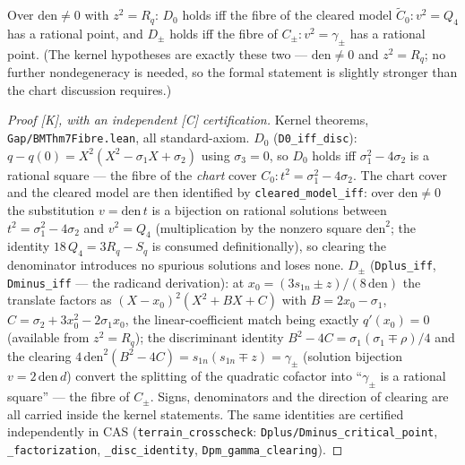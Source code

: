 \begin{proposition}\label{prop:fibre_correspondence}\leanok
Over $\mathrm{den}\neq0$ with $z^{2}=R_{q}$: $D_{0}$ holds iff the fibre of the
cleared model $\widetilde C_{0}\colon v^{2}=Q_{4}$ has a rational point, and
$D_{\pm}$ holds iff the fibre of $C_{\pm}\colon v^{2}=\gamma_{\pm}$ has a
rational point.  (The kernel hypotheses are exactly these two ---
$\mathrm{den}\neq0$ and $z^{2}=R_{q}$; no further nondegeneracy is needed, so
the formal statement is slightly stronger than the chart discussion requires.)
\end{proposition}
\begin{proof}[Proof {[K]}, with an independent {[C]} certification]\leanok
Kernel theorems, \texttt{Gap/BMThm7Fibre.lean}, all standard-axiom.
$D_{0}$ (\texttt{D0\_iff\_disc}): $q-q(0)=X^{2}(X^{2}-\sigma_{1}X+\sigma_{2})$
using $\sigma_{3}=0$, so $D_{0}$ holds iff $\sigma_{1}^{2}-4\sigma_{2}$ is a
rational square --- the fibre of the \emph{chart} cover
$C_{0}\colon t^{2}=\sigma_{1}^{2}-4\sigma_{2}$.  The chart cover and the
cleared model are then identified by \texttt{cleared\_model\_iff}: over
$\mathrm{den}\neq0$ the substitution $v=\mathrm{den}\,t$ is a bijection on
rational solutions between $t^{2}=\sigma_{1}^{2}-4\sigma_{2}$ and
$v^{2}=Q_{4}$ (multiplication by the nonzero square $\mathrm{den}^{2}$; the
identity $18\,Q_{4}=3R_{q}-S_{q}$ is consumed definitionally), so clearing the
denominator introduces no spurious solutions and loses none.
$D_{\pm}$ (\texttt{Dplus\_iff}, \texttt{Dminus\_iff} --- the radicand
derivation): at $x_{0}=(3s_{1n}\pm z)/(8\,\mathrm{den})$ the translate factors
as $(X-x_{0})^{2}(X^{2}+BX+C)$ with $B=2x_{0}-\sigma_{1}$,
$C=\sigma_{2}+3x_{0}^{2}-2\sigma_{1}x_{0}$, the linear-coefficient match being
exactly $q'(x_{0})=0$ (available from $z^{2}=R_{q}$); the discriminant identity
$B^{2}-4C=\sigma_{1}(\sigma_{1}\mp\rho)/4$ and the clearing
$4\,\mathrm{den}^{2}(B^{2}-4C)=s_{1n}(s_{1n}\mp z)=\gamma_{\pm}$ (solution
bijection $v=2\,\mathrm{den}\,d$) convert the splitting of the quadratic
cofactor into ``$\gamma_{\pm}$ is a rational square'' --- the fibre of
$C_{\pm}$.  Signs, denominators and the direction of clearing are all carried
inside the kernel statements.  The same identities are certified independently
in CAS (\texttt{terrain\_crosscheck}:
\texttt{Dplus/Dminus\_critical\_point}, \texttt{\_factorization},
\texttt{\_disc\_identity}, \texttt{Dpm\_gamma\_clearing}).
\end{proof}


